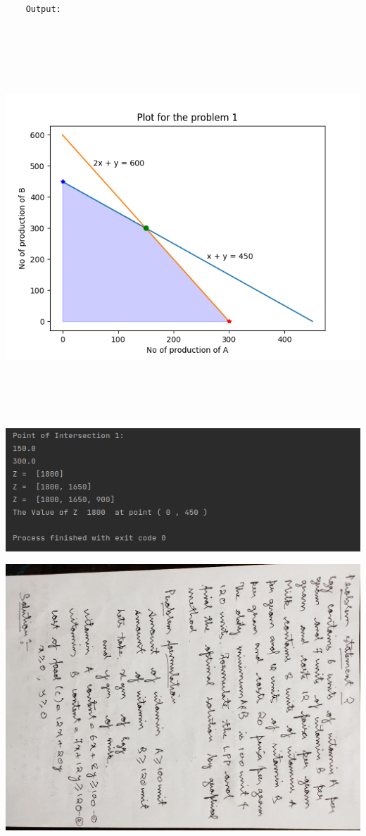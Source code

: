 \documentclass[12pt, letterpaper, twoside]{book}
\begin{document}
\pagebreak
\begin{lstlisting}

	Output:
	
\end{lstlisting}
\begin{center}
\includegraphics[height=400pt]{Plot1}
\end{center}
\begin{flushleft}
\includegraphics[width=\paperwidth]{Output1}
\end{flushleft}
\includegraphics[width=\paperheight, height=\paperwidth, angle=90]{Page6}
\end{document}
